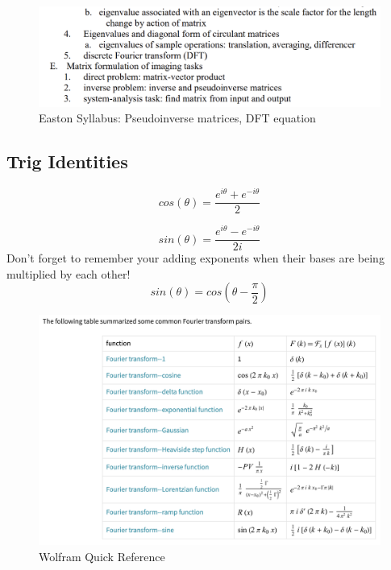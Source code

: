 \documentclass{article}
\begin{document}
\begin{figure}[h!]
\centering
\includegraphics[scale=.65]{Fourier/Week 2/Week2.2.png}
\caption{Easton Syllabus: Pseudoinverse matrices, DFT equation}
\label{fig:Snowman}
\end{figure}
\clearpage
\subsection{Trig Identities}
\begin{equation}
    cos(\theta)= \frac{e^{i \theta}+e^{-i \theta}}{2}
\end{equation}

\begin{equation}
    sin(\theta)= \frac{e^{i \theta}-e^{-i \theta}}{2i}
\end{equation}
Don't forget to remember your adding exponents when their bases are being multiplied by each other!
\begin{equation}
    sin(\theta)= cos(\theta - \frac{\pi}{2}) 
\end{equation}

\begin{figure}[h!]
\centering
\includegraphics[scale=.65]{Fourier/Week 2/HW/FourierTransformSheet.png}
\caption{Wolfram Quick Reference}
\label{fig:Snowman}
\end{figure}
\end{document}
